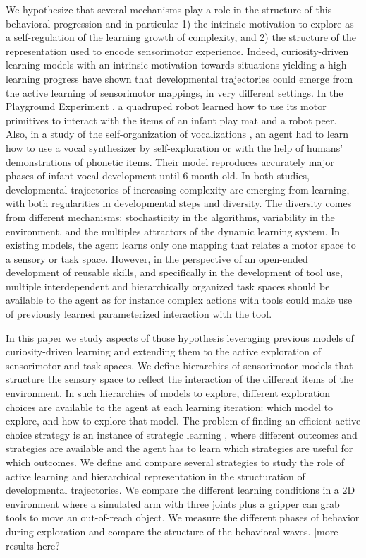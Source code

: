 \documentclass[10pt,letterpaper]{article}
\begin{document}
	We hypothesize that several mechanisms play a role in the structure of this behavioral progression and in particular 
	1) the intrinsic motivation to explore as a self-regulation of the learning growth of complexity, and 
	2) the structure of the representation used to encode sensorimotor experience.	
	Indeed, curiosity-driven learning models with an intrinsic motivation towards situations yielding a high learning progress 
	have shown that developmental trajectories could emerge from the active learning of sensorimotor mappings, in very different settings.
	In the Playground Experiment \cite{oudeyer_what_2007}, a quadruped robot learned how to use its motor primitives to interact with the items of an infant play mat and a robot peer.
	Also, in a study of the self-organization of vocalizations \cite{moulin-frier_self-organization_2014}, an agent had to learn how to
	use a vocal synthesizer by self-exploration or with the help of humans' demonstrations of phonetic items. 
	Their model reproduces accurately major phases of infant vocal development until $6$ month old.
	In both studies, developmental trajectories of increasing complexity are emerging from learning, with both regularities in developmental steps and diversity.
	The diversity comes from different mechanisms: stochasticity in the algorithms, variability in the environment, and the multiples attractors of the dynamic learning system.
	In existing models, the agent learns only one mapping that relates a motor space to a sensory or task space. 
	However, in the perspective of an open-ended development of reusable skills, and specifically in the development of tool use, multiple interdependent and hierarchically organized task spaces should be available to the agent
	as for instance complex actions with tools could make use of previously learned parameterized interaction with the tool.
	
	In this paper we study aspects of those hypothesis leveraging previous models of curiosity-driven learning and extending them to the active exploration of sensorimotor and task spaces.
	We define hierarchies of sensorimotor models that structure the sensory space to reflect the interaction of the different items of the environment.
	In such hierarchies of models to explore, different exploration choices are available to the agent at each learning iteration: which model to explore, and how to explore that model.
	The problem of finding an efficient active choice strategy is an instance of strategic learning \cite{nguyen2012}, 
	where different outcomes and strategies are available and the agent has to learn which strategies are useful for which outcomes. 
	We define and compare several strategies to study the role of active learning and hierarchical representation in the structuration of developmental trajectories.
	We compare the different learning conditions in a $2$D environment where a simulated arm with three joints plus a gripper can grab tools to move an out-of-reach object.
	We measure the different phases of behavior during exploration and compare the structure of the behavioral waves. [more results here?]
	
\end{document}
